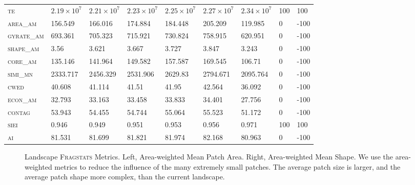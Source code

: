 \begin{landscape}
\begin{table}[!htbp]
\begin{tabular}{@{}llllll|lll@{}}
\small \textsc{te}              & $2.19 \times 10^7$  & $2.21 \times 10^7$ & $2.23 \times 10^7$ & $2.25 \times 10^7$ & $2.27 \times 10^7$    & $2.34 \times 10^7$      & 100      & 100  \\
\small \textsc{area\_am}         & 156.549  & 166.016  & 174.884  & 184.448  & 205.209    & 119.985       & 0        & -100 \\
\small \textsc{gyrate\_am}       & 693.361  & 705.323  & 715.921  & 730.824  & 758.915    & 620.951       & 0        & -100 \\
\small \textsc{shape\_am}        & 3.56     & 3.621    & 3.667    & 3.727    & 3.847      & 3.243         & 0        & -100 \\
\small \textsc{core\_am}         & 135.146  & 141.964  & 149.582  & 157.587  & 169.545    & 106.71        & 0        & -100 \\
\small \textsc{simi\_mn}         & 2333.717 & 2456.329 & 2531.906 & 2629.83  & 2794.671   & 2095.764      & 0        & -100 \\
\small \textsc{cwed}             & 40.608   & 41.114   & 41.51    & 41.95    & 42.564     & 36.092        & 0        & -100 \\
\small \textsc{econ\_am}         & 32.793   & 33.163   & 33.458   & 33.833   & 34.401     & 27.756        & 0        & -100 \\
\small \textsc{contag}           & 53.943   & 54.455   & 54.744   & 55.064   & 55.523     & 51.172        & 0        & -100 \\
\small \textsc{siei}             & 0.946    & 0.949    & 0.951    & 0.953    & 0.956      & 0.971         & 100      & 100  \\
\small \textsc{ai}               & 81.531   & 81.699   & 81.821   & 81.974   & 82.168     & 80.963        & 0        & -100 \\ \bottomrule
\end{tabular}
\end{table}
\end{landscape}

\clearpage
\begin{figure}[!htbp]
  \centering
\caption{Landscape \textsc{Fragstats} Metrics. Left, Area-weighted Mean Patch Area. Right, Area-weighted Mean Shape. We use the area-weighted metrics to reduce the influence of the many extremely small patches. The average patch size is larger, and the average patch shape more complex, than the current landscape.} 
\label{fig:fragland_areashape}
\end{figure}

